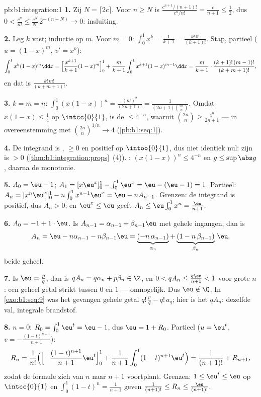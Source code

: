\begin{solution}{pb:b1:integration:1}
\textbf{1.} Zij $N = \lceil 2c \rceil$. Voor $n \geq N$ is
$\frac{c^{n+1}/(n+1)!}{c^n/n!} = \frac{c}{n+1} \leq \frac12$, dus
$0 < \frac{c^n}{n!} \leq \frac{c^N}{N!}\,2^{-(n - N)} \to 0$:
insluiting.

\textbf{2.} Leg $k$ vast; inductie op $m$. Voor $m = 0$:
$\int_0^1 x^k = \frac{1}{k+1} = \frac{k!\,0!}{(k+1)!}$. Stap,
partieel ($u = (1-x)^m$, $v' = x^k$):
\[
\int_0^1 x^k (1-x)^m \dd x
= \Bigl[\frac{x^{k+1}}{k+1}(1-x)^m\Bigr]_0^1
+ \frac{m}{k+1}\int_0^1 x^{k+1}(1-x)^{m-1}\dd x
= \frac{m}{k+1}\cdot\frac{(k+1)!\,(m-1)!}{(k+m+1)!} ,
\]
en dat is $\frac{k!\,m!}{(k+m+1)!}$.

\textbf{3.} $k = m = n$: $\int_0^1 (x(1-x))^n =
\frac{(n!)^2}{(2n+1)!} = \frac{1}{(2n+1)\binom{2n}{n}}$. Omdat
$x(1-x) \leq \frac14$ op $\intcc{0}{1}$, is de  $\leq
4^{-n}$, waaruit $\binom{2n}{n} \geq \frac{4^n}{2n+1}$ --- in
overeenstemming met $\binom{2n}{n}^{1/n} \to 4$
(\cref{pb:b1:seq:1}).

\textbf{4.} De integrand is , $\geq 0$ en positief op
$\intoo{0}{1}$, dus niet identiek nul: zijn  is $> 0$
(\cref{thm:b1:integration:props}~(4)). : $(x(1-x))^n
\leq 4^{-n}$ en $g \leq \sup\abs g$, daarna de monotonie.

\textbf{5.} $A_0 = \eu - 1$; $A_1 = [x\eu^x]_0^1 - \int_0^1
\eu^x = \eu - (\eu - 1) = 1$. Partieel: $A_n = [x^n \eu^x]_0^1 -
n\int_0^1 x^{n-1}\eu^x = \eu - n A_{n-1}$. Grenzen: de integrand
is positief, dus $A_n > 0$; en $\eu^x \leq \eu$ geeft $A_n \leq
\eu\int_0^1 x^n = \frac{\eu}{n+1}$.

\textbf{6.} $A_0 = -1 + 1\cdot\eu$. Is $A_{n-1} = \alpha_{n-1} +
\beta_{n-1}\eu$ met gehele ingangen, dan is
\[
A_n = \eu - n\alpha_{n-1} - n\beta_{n-1}\eu
= \underbrace{(-n\,\alpha_{n-1})}_{\alpha_n}
+ \underbrace{(1 - n\,\beta_{n-1})}_{\beta_n}\,\eu ,
\]
beide geheel.

\textbf{7.} Is $\eu = \frac pq$, dan is $q A_n = q\alpha_n +
p\beta_n \in \Z$, en $0 < qA_n \leq \frac{q\eu}{n+1} < 1$ voor
grote $n$: een geheel getal strikt tussen $0$ en $1$ ---
onmogelijk. Dus $\eu \notin \Q$. In \cref{exo:b1:seq:9} was het
gevangen gehele getal $q!\,\frac pq - q!\,a_q$; hier is het
$qA_n$: dezelfde val, integrale brandstof.

\textbf{8.} $n = 0$: $R_0 = \int_0^1 \eu^t = \eu - 1$, dus $\eu =
1 + R_0$. Partieel ($u = \eu^t$, $v = -\frac{(1-t)^{n+1}}{n+1}$):
\[
R_n = \frac{1}{n!}\Bigl(\Bigl[-\frac{(1-t)^{n+1}}{n+1}
\eu^t\Bigr]_0^1 + \frac{1}{n+1}\int_0^1 (1-t)^{n+1}\eu^t\Bigr)
= \frac{1}{(n+1)!} + R_{n+1} ,
\]
zodat de formule zich van $n$ naar $n + 1$ voortplant. Grenzen:
$1 \leq \eu^t \leq \eu$ op $\intcc{0}{1}$ en $\int_0^1 (1-t)^n =
\frac{1}{n+1}$ geven $\frac{1}{(n+1)!} \leq R_n \leq
\frac{\eu}{(n+1)!}$.


\end{solution}
